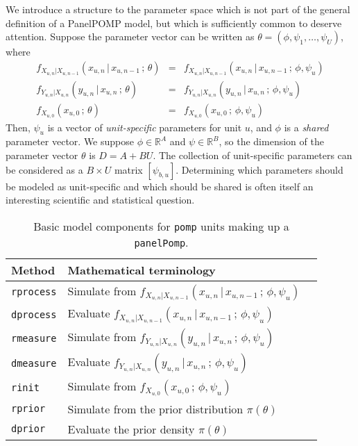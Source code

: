 \documentclass[12pt]{article}\usepackage[]{graphicx}\usepackage[table]{xcolor}
\newcommand\code{\texttt}
\newcommand\unit{u} %
\newcommand\Unit{U} %
\renewcommand\time{n}
\newcommand\shared{\phi}
\newcommand\specific{\psi}
\newcommand\Nshared{A}
\newcommand\Nspecific{B}
\newcommand\nspecific{b}
\newcommand\RealSpace{\mathbb{R}}
\newcommand\Thetadim{D}
\newcommand\given{{\, | \,}}
\newcommand\giventh{{\,;\,}}
\begin{document}
We introduce a structure to the parameter space which is not part of the general definition of a PanelPOMP model, but which is sufficiently common to deserve attention.
Suppose the parameter vector can be written as
$\theta=(\shared,\specific_1,\dots,\specific_\Unit)$,
where
\begin{eqnarray}
\label{eq:b1a}
f_{X_{\unit,\time}\vert X_{\unit,\time-1}}(x_{\unit,\time}\given x_{\unit,\time-1} \giventh \theta)
&=&
f_{X_{\unit,\time}|X_{\unit,\time-1}}(x_{\unit,\time}\given x_{\unit,\time-1} \giventh \shared,\specific_\unit)
\\
\label{eq:b1b}
f_{Y_{\unit,\time}|X_{\unit,\time}}(y_{\unit,\time}\given x_{\unit,\time} \giventh \theta) &=& f_{Y_{\unit,\time}|X_{\unit,\time}}(y_{\unit,\time}\given x_{\unit,\time} \giventh \shared,\specific_\unit)
\\
\label{eq:b1c}
f_{X_{\unit,0}}(x_{\unit,0} \giventh \theta) &=& f_{X_{\unit,0}}(x_{\unit,0} \giventh \shared,\specific_\unit)
\end{eqnarray}
Then, $\specific_{\unit}$ is a vector of \emph{unit-specific} parameters for unit $\unit$, and $\shared$ is a \emph{shared} parameter vector.
We suppose $\shared\in\RealSpace^{\Nshared}$ and $\specific\in\RealSpace^{\Nspecific}$, so the dimension of the parameter vector $\theta$ is $\Thetadim=\Nshared+\Nspecific\Unit$.
The collection of unit-specific parameters can be considered as a $\Nspecific\times\Unit$ matrix $[\specific_{\nspecific,\unit}]$.
Determining which parameters should be modeled as unit-specific and which should be shared is often itself an interesting scientific and statistical question.

\begin{table}[t!]
  \begin{center}
    \begin{tabular}{lll}
      \hline
      Method &Mathematical terminology \\
      \hline
      \code{rprocess} &Simulate from $f_{X_{\unit,n}|X_{\unit,n-1}}( x_{\unit,n} \given x_{\unit,n-1}\giventh \shared,\specific_\unit)$\\
      \code{dprocess} &Evaluate $f_{X_{\unit,n}|X_{\unit,n-1}}( x_{\unit,n} \given x_{\unit,n-1}\giventh \shared,\specific_{\unit})$\\
      \code{rmeasure} &Simulate from $f_{Y_{\unit,n}|X_{\unit,n}}( y_{\unit,n} \given x_{\unit,n}\giventh \shared,\specific_\unit)$\\
      \code{dmeasure} &Evaluate $f_{Y_{\unit,n}|X_{\unit,n}}( y_{\unit,n} \given x_{\unit,n}\giventh \shared,\specific_{\unit})$\\
       \code{rinit} &Simulate from $f_{X_{\unit,0}}( x_{\unit,0} \giventh \shared,\specific_\unit)$\\
    \code{rprior} & Simulate from the prior distribution $\pi(\theta)$ \\
    \code{dprior} & Evaluate the prior density $\pi(\theta)$ \\\hline
    \end{tabular}
  \end{center}
  \caption{Basic model components for \code{pomp} units making up a \code{panelPomp}.
    \label{tab:notation}
  }
\end{table}
\end{document}
